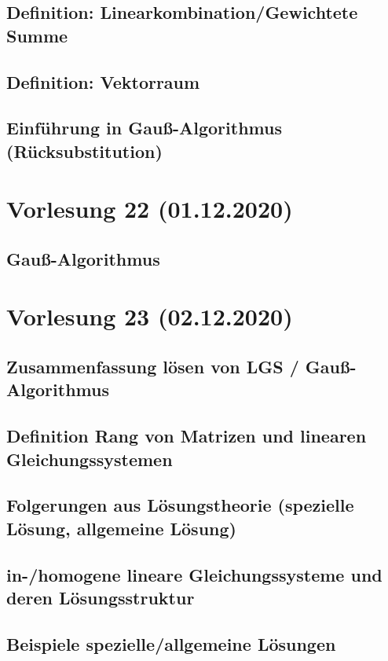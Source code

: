 \documentclass[]{article}
\begin{document}
\subsection{Definition: Linearkombination/Gewichtete Summe}
\subsection{Definition: Vektorraum}
\subsection{Einführung in Gauß-Algorithmus (Rücksubstitution)}


\section{Vorlesung 22 (01.12.2020)}
\subsection{Gauß-Algorithmus}


\section{Vorlesung 23 (02.12.2020)}
\subsection{Zusammenfassung lösen von LGS / Gauß-Algorithmus}
\subsection{Definition Rang von Matrizen und linearen Gleichungssystemen}
\subsection{Folgerungen aus Lösungstheorie (spezielle Lösung, allgemeine Lösung)}
\subsection{in-/homogene lineare Gleichungssysteme und deren Lösungsstruktur}
\subsection{Beispiele spezielle/allgemeine Lösungen}

\end{document}
